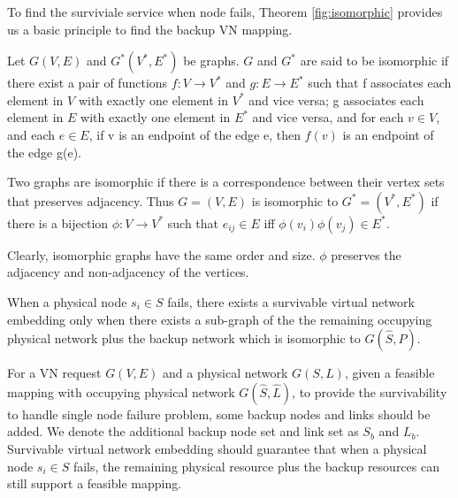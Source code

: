 To find the surviviale service when node fails,
Theorem \ref{fig:isomorphic} provides us a basic principle to find the backup VN mapping.




Let $G(V,E)$ and $G^*(V^*,E^*)$ be graphs. $G$ and $G^*$ are said to be isomorphic if there exist a pair of functions $f:V\rightarrow V^*$ and $g :E\rightarrow E^*$ such that f associates each element in $V$ with exactly one element in $V^*$ and vice versa; g associates each element in $E$ with exactly one element in $E^*$ and vice versa, and for each $v\in V$, and each $e\in E$, if v is an endpoint of the edge e, then $f(v)$ is an endpoint of the edge g(e).

\begin{theorem}
Two graphs are isomorphic if there is a correspondence between their vertex sets that preserves adjacency. Thus $G = (V, E)$ is isomorphic to $G^* = (V^*, E^*)$ if there is a bijection $\phi:V\rightarrow V^*$ such that $e_{ij}\in E$ iff $\phi(v_i)\phi(v_j)\in E^*$.
\end{theorem}
Clearly, isomorphic graphs have the same order and size. $\phi$ preserves the adjacency and non-adjacency of the vertices.



When a physical node $ {s_i} \in S $ fails, there exists a  survivable virtual network embedding  only when there exists  a sub-graph of the the remaining occupying physical network plus the backup network which is isomorphic to $G\left( {\hat S,P} \right)$.




For a VN request $G (V,E)$ and a physical network $G (S,L)$, given a feasible mapping with occupying physical network $G\left( {\hat S,\hat L} \right)$, to provide the survivability to handle single node failure problem, some backup nodes and links should be added. We denote the additional backup node set and link set as $S_b$ and $L_b$. Survivable virtual network embedding should guarantee that when a physical node $ {s_i} \in S $ fails, the remaining physical resource plus the backup resources can still support a feasible mapping.


